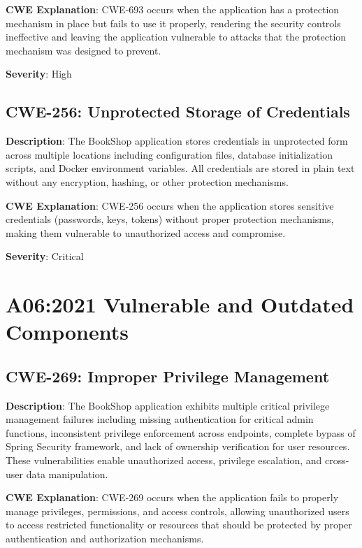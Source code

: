 \documentclass[]{UCD_CS_FYP_Report}
\begin{document}
\textbf{CWE Explanation}: CWE-693 occurs when the application has a protection mechanism in place but fails to use it properly, rendering the security controls ineffective and leaving the application vulnerable to attacks that the protection mechanism was designed to prevent.

\textbf{Severity}: High



\section{CWE-256: Unprotected Storage of Credentials}

\textbf{Description}: The BookShop application stores credentials in unprotected form across multiple locations including configuration files, database initialization scripts, and Docker environment variables. All credentials are stored in plain text without any encryption, hashing, or other protection mechanisms.

\textbf{CWE Explanation}: CWE-256 occurs when the application stores sensitive credentials (passwords, keys, tokens) without proper protection mechanisms, making them vulnerable to unauthorized access and compromise.

\textbf{Severity}: Critical



\chapter{A06:2021 Vulnerable and Outdated Components}

\section{CWE-269: Improper Privilege Management}

\textbf{Description}: The BookShop application exhibits multiple critical privilege management failures including missing authentication for critical admin functions, inconsistent privilege enforcement across endpoints, complete bypass of Spring Security framework, and lack of ownership verification for user resources. These vulnerabilities enable unauthorized access, privilege escalation, and cross-user data manipulation.

\textbf{CWE Explanation}: CWE-269 occurs when the application fails to properly manage privileges, permissions, and access controls, allowing unauthorized users to access restricted functionality or resources that should be protected by proper authentication and authorization mechanisms.
\end{document}

